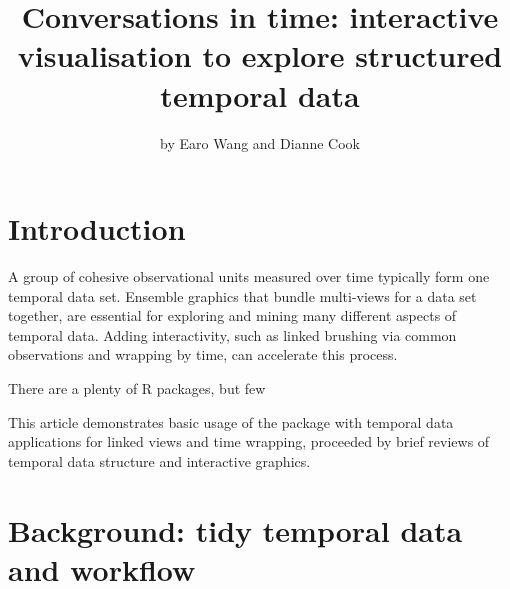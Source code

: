 \title{Conversations in time: interactive visualisation to explore
structured temporal data}
\author{by Earo Wang and Dianne Cook}

\maketitle


\hypertarget{introduction}{%
\section{Introduction}\label{introduction}}

A group of cohesive observational units measured over time typically
form one temporal data set. Ensemble graphics
\citep{unwin_ensemble_2018} that bundle multi-views for a data set
together, are essential for exploring and mining many different aspects
of temporal data. Adding interactivity, such as linked brushing via
common observations and wrapping by time, can accelerate this process.

There are a plenty of R packages, but few

This article demonstrates basic usage of the 
package with temporal data applications for linked views and time
wrapping, proceeded by brief reviews of temporal data structure and
interactive graphics.

\hypertarget{background-tidy-temporal-data-and-workflow}{%
\section{Background: tidy temporal data and
workflow}\label{background-tidy-temporal-data-and-workflow}}

